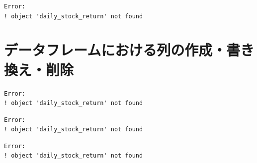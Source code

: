 \documentclass[
  letterpaper,
  DIV=11,
  numbers=noendperiod]{scrreprt}
\newenvironment{Shaded}{\begin{snugshade}}{\end{snugshade}}
\newcommand{\CommentTok}[1]{\textcolor[rgb]{0.37,0.37,0.37}{#1}}
\newcommand{\ConstantTok}[1]{\textcolor[rgb]{0.56,0.35,0.01}{#1}}
\newcommand{\DecValTok}[1]{\textcolor[rgb]{0.68,0.00,0.00}{#1}}
\newcommand{\NormalTok}[1]{\textcolor[rgb]{0.00,0.23,0.31}{#1}}
\newcommand{\OtherTok}[1]{\textcolor[rgb]{0.00,0.23,0.31}{#1}}
\newcommand{\SpecialCharTok}[1]{\textcolor[rgb]{0.37,0.37,0.37}{#1}}
\begin{document}
\begin{verbatim}
Error:
! object 'daily_stock_return' not found
\end{verbatim}

\section{データフレームにおける列の作成・書き換え・削除}\label{ux30c7ux30fcux30bfux30d5ux30ecux30fcux30e0ux306bux304aux3051ux308bux5217ux306eux4f5cux6210ux66f8ux304dux63dbux3048ux524aux9664}

\begin{Shaded}
\end{Shaded}

\begin{verbatim}
Error:
! object 'daily_stock_return' not found
\end{verbatim}

\begin{Shaded}
\end{Shaded}

\begin{verbatim}
Error:
! object 'daily_stock_return' not found
\end{verbatim}

\begin{Shaded}
\end{Shaded}

\begin{verbatim}
Error:
! object 'daily_stock_return' not found
\end{verbatim}
\end{document}
